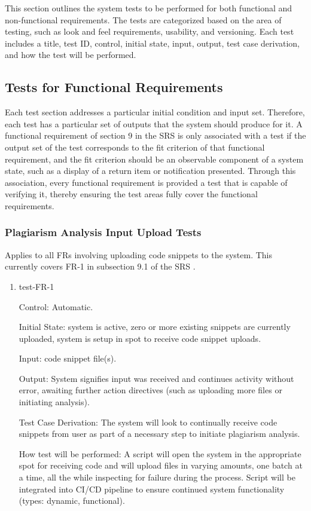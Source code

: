\documentclass[12pt, titlepage]{article}
\begin{document}
This section outlines the system tests to be performed for both functional and non-functional requirements. 
The tests are categorized based on the area of testing, such as look and feel requirements, usability, and versioning. 
Each test includes a title, test ID, control, initial state, input, output, test case derivation, and how the test will be performed.

\subsection{Tests for Functional Requirements}

Each test section addresses a particular initial condition and input set. 
Therefore, each test has a particular set of outputs that the system should 
produce for it. A functional requirement of section 9 in the SRS \citep{SRS}
is only associated with a test if the output set of the test corresponds to 
the fit criterion of that functional requirement, and the fit criterion should 
be an observable component of a system state, such as a display of a return 
item or notification presented. Through this association, every functional 
requirement is provided a test that is capable of verifying it, thereby ensuring 
the test areas fully cover the functional requirements.

\subsubsection{Plagiarism Analysis Input Upload Tests}

Applies to all FRs involving uploading code snippets to the system. This currently 
covers FR-1 in subsection 9.1 of the SRS \citep{SRS}.

\begin{enumerate}

\item{test-FR-1\\}

Control: Automatic.
					
Initial State: system is active, zero or more existing snippets are currently 
uploaded, system is setup in spot to receive code snippet uploads.
					
Input: code snippet file(s).
					
Output: System signifies input was received and continues activity without 
error, awaiting further action directives (such as uploading more files or 
initiating analysis).

Test Case Derivation: The system will look to continually receive code 
snippets from user as part of a necessary step to initiate plagiarism analysis.
					
How test will be performed: A script will open the system in the appropriate spot for 
receiving code and will upload files in varying amounts, one batch at a time, all the 
while inspecting for failure during the process. Script will be integrated into CI/CD
pipeline to ensure continued system functionality (types: dynamic, functional).
					

\end{enumerate}
\end{document}
